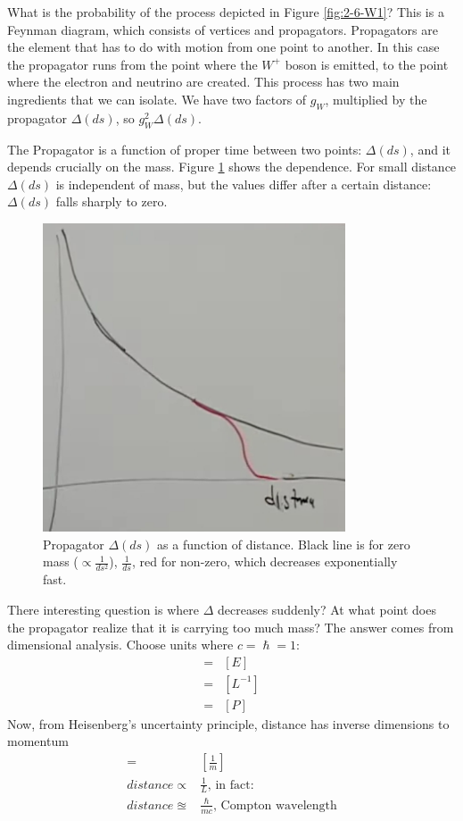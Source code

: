 \documentclass[]{article}
\begin{document}
What is the probability of the process depicted in  Figure \ref{fig:2-6-W1}? This is a Feynman diagram, which consists of vertices and propagators. Propagators are the element that has to do with motion from one point to another. In this case the propagator runs from the point where the $W^+$ boson is emitted, to the point where the electron and neutrino are created. This process has two main ingredients that we can isolate. We have two factors of $g_W$, multiplied by the propagator $\Delta(ds)$, so $g_W^2\Delta(ds)$.

The Propagator is a function of proper time between two points: $\Delta(ds)$, and it depends crucially on the mass. Figure \ref{fig:2-6-propagator} shows the dependence. For small distance $\Delta(ds)$ is independent of mass, but the values differ after a certain distance: $\Delta(ds)$ falls sharply to zero.

\begin{figure}[H]
	\caption[Propagator $\Delta(ds)$ as a function of distance.]{Propagator $\Delta(ds)$ as a function of distance. Black line is for zero mass ($\propto \frac{1}{ds^2}$), $\frac{1}{ds}$, red for non-zero, which decreases exponentially fast.}\label{fig:2-6-propagator}
	\includegraphics[width=0.8\textwidth]{2-6-propagator}
\end{figure}

There interesting question is where $\Delta$ decreases suddenly? At what point does the propagator realize that it is carrying too much mass? The answer comes from dimensional analysis. Choose units where $c=\hslash=1$:
\begin{align*}
	[m] =& [E]\\
	=& [L^{-1}]\\
	=& [P]
\end{align*}
Now, from Heisenberg's uncertainty principle, distance has inverse dimensions to momentum
\begin{align*}
	[L]=& [\frac{1}{m}]\\
	distance \propto & \frac{1}{L} \text{, in fact:}\\
	distance \approxeq & \frac{\hslash}{mc} \text {, Compton wavelength}
\end{align*}
\end{document}

